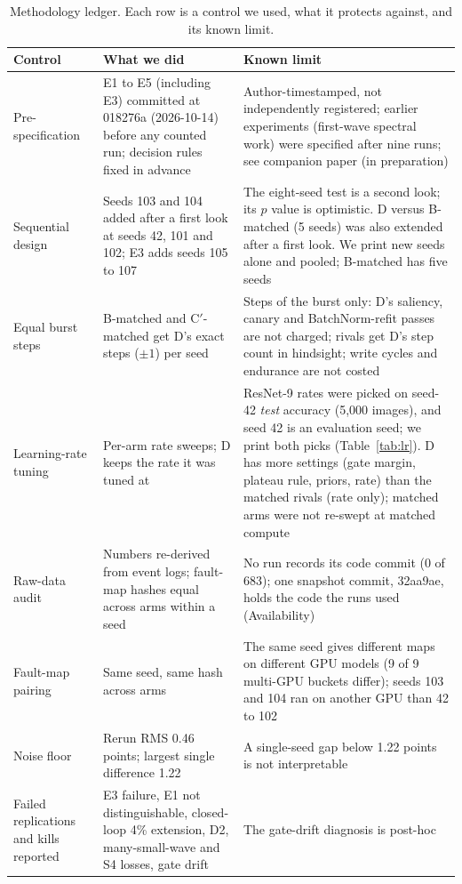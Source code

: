 \documentclass[journal]{IEEEtran}
\begin{document}
\begin{table}[t]
\centering
\caption{Methodology ledger. Each row is a control we used, what it protects against, and its known limit.}
\label{tab:ledger}
\small
\begin{tabular}{p{3.0cm}p{6.6cm}p{6.1cm}}
\toprule
Control & What we did & Known limit \\
\midrule
Pre-specification & E1 to E5 (including E3) committed at 018276a (2026-10-14) before any counted run; decision rules fixed in advance
& Author-timestamped, not independently registered; earlier experiments (first-wave spectral work) were specified after nine runs; see companion paper (in preparation) \\
Sequential design & Seeds 103 and 104 added after a first look at seeds 42, 101 and 102; E3 adds seeds 105 to 107
& The eight-seed test is a second look; its $p$ value is optimistic. D versus B-matched (5 seeds) was also extended after a first look. We print new seeds alone and pooled; B-matched has five seeds \\
Equal burst steps & B-matched and C$'$-matched get D's exact steps ($\pm 1$) per seed
& Steps of the burst only: D's saliency, canary and BatchNorm-refit passes are not charged; rivals get D's step count in hindsight; write cycles and endurance are not costed \\
Learning-rate tuning & Per-arm rate sweeps; D keeps the rate it was tuned at
& ResNet-9 rates were picked on seed-42 \emph{test} accuracy (5,000 images), and seed 42 is an evaluation seed; we print both picks (Table~\ref{tab:lr}). D has more settings (gate margin, plateau rule, priors, rate) than the matched rivals (rate only); matched arms were not re-swept at matched compute \\
Raw-data audit & Numbers re-derived from event logs; fault-map hashes equal across arms within a seed
& No run records its code commit (0 of 683); one snapshot commit, 32aa9ae, holds the code the runs used (Availability) \\
Fault-map pairing & Same seed, same hash across arms
& The same seed gives different maps on different GPU models (9 of 9 multi-GPU buckets differ); seeds 103 and 104 ran on another GPU than 42 to 102 \\
Noise floor & Rerun RMS 0.46 points; largest single difference 1.22
& A single-seed gap below 1.22 points is not interpretable \\
Failed replications and kills reported & E3 failure, E1 not distinguishable, closed-loop 4\% extension, D2, many-small-wave and S4 losses, gate drift
& The gate-drift diagnosis is post-hoc \\
\bottomrule
\end{tabular}
\end{table}
\end{document}
